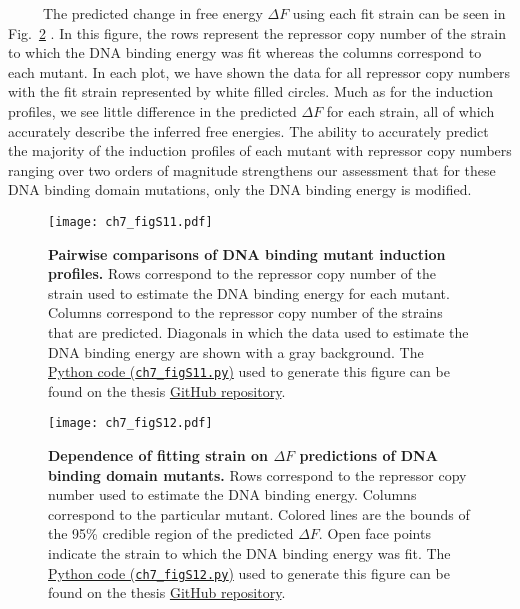 \documentclass[12pt]{caltech_thesis}
\begin{document}
~~~~~The predicted change in free energy \(\Delta F\) using each fit
strain can be seen in Fig.~\ref{fig:DNA_delF_pairwise_comparison} . In
this figure, the rows represent the repressor copy number of the strain
to which the DNA binding energy was fit whereas the columns correspond
to each mutant. In each plot, we have shown the data for all repressor
copy numbers with the fit strain represented by white filled circles.
Much as for the induction profiles, we see little difference in the
predicted \(\Delta F\) for each strain, all of which accurately describe
the inferred free energies. The ability to accurately predict the
majority of the induction profiles of each mutant with repressor copy
numbers ranging over two orders of magnitude strengthens our assessment
that for these DNA binding domain mutations, only the DNA binding energy
is modified.

\hypertarget{fig:DNA_profile_pairwise_comparisons}{%
\begin{figure}
\centering
\texttt{[image: ch7\_figS11.pdf]}
\caption[{Pairwise comparisons of DNA binding mutant estimated induction
profiles.}]{\textbf{Pairwise comparisons of DNA binding mutant induction
profiles.} Rows correspond to the repressor copy number of the strain
used to estimate the DNA binding energy for each mutant. Columns
correspond to the repressor copy number of the strains that are
predicted. Diagonals in which the data used to estimate the DNA binding
energy are shown with a gray background. The
\href{https://github.com/gchure/phd/blob/master/src/chapter_07/code/ch7_figS11.py}{Python
code (\texttt{ch7\_figS11.py})} used to generate this figure can be
found on the thesis \href{https://github.com/gchure/phd}{GitHub
repository}.}
\label{fig:DNA_profile_pairwise_comparisons}
\end{figure}
}

\hypertarget{fig:DNA_delF_pairwise_comparison}{%
\begin{figure}
\centering
\texttt{[image: ch7\_figS12.pdf]}
\caption[{Dependence of fitting strain on \(\Delta F\) predictions of
DNA binding domain mutants.}]{\textbf{Dependence of fitting strain on
\(\Delta F\) predictions of DNA binding domain mutants.} Rows correspond
to the repressor copy number used to estimate the DNA binding energy.
Columns correspond to the particular mutant. Colored lines are the
bounds of the 95\% credible region of the predicted \(\Delta F\). Open
face points indicate the strain to which the DNA binding energy was fit.
The
\href{https://github.com/gchure/phd/blob/master/src/chapter_07/code/ch7_figS12.py}{Python
code (\texttt{ch7\_figS12.py})} used to generate this figure can be
found on the thesis \href{https://github.com/gchure/phd}{GitHub
repository}.}
\label{fig:DNA_delF_pairwise_comparison}
\end{figure}
}
\end{document}
